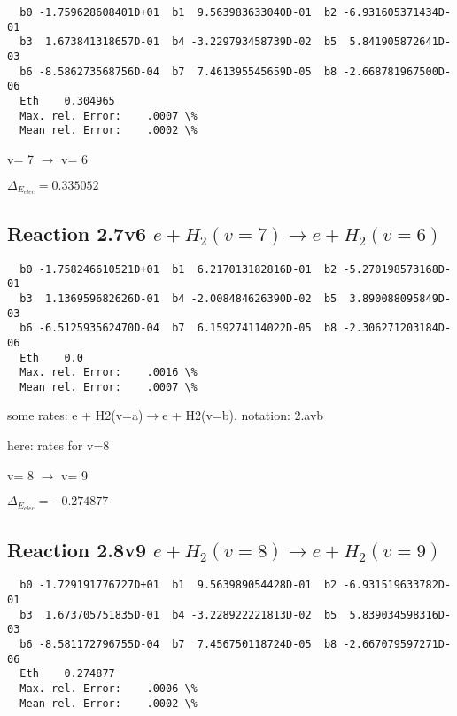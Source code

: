 \documentclass[12pt,dvipdfmx]{article}
\begin{document}
\begin{small}\begin{verbatim}
  b0 -1.759628608401D+01  b1  9.563983633040D-01  b2 -6.931605371434D-01
  b3  1.673841318657D-01  b4 -3.229793458739D-02  b5  5.841905872641D-03
  b6 -8.586273568756D-04  b7  7.461395545659D-05  b8 -2.668781967500D-06
  Eth    0.304965
  Max. rel. Error:    .0007 \%
  Mean rel. Error:    .0002 \%

\end{verbatim}\end{small}

  v=  7 $\rightarrow$ v= 6

$\Delta_{E_{elec}}= 0.335052$


\subsection{
Reaction 2.7v6
$ e + H_2(v=7) \rightarrow e + H_2(v=6) $
}


\begin{small}\begin{verbatim}
  b0 -1.758246610521D+01  b1  6.217013182816D-01  b2 -5.270198573168D-01
  b3  1.136959682626D-01  b4 -2.008484626390D-02  b5  3.890088095849D-03
  b6 -6.512593562470D-04  b7  6.159274114022D-05  b8 -2.306271203184D-06
  Eth    0.0
  Max. rel. Error:    .0016 \%
  Mean rel. Error:    .0007 \%

\end{verbatim}\end{small}
\newpage
some rates: e + H2(v=a)$\rightarrow$e + H2(v=b). notation: 2.avb

here: rates for v=8


  v=  8 $\rightarrow$ v= 9

$\Delta_{E_{elec}}=-0.274877$


\subsection{
Reaction 2.8v9
$ e + H_2(v=8) \rightarrow e + H_2(v=9) $
}

\begin{small}\begin{verbatim}
  b0 -1.729191776727D+01  b1  9.563989054428D-01  b2 -6.931519633782D-01
  b3  1.673705751835D-01  b4 -3.228922221813D-02  b5  5.839034598316D-03
  b6 -8.581172796755D-04  b7  7.456750118724D-05  b8 -2.667079597271D-06
  Eth    0.274877
  Max. rel. Error:    .0006 \%
  Mean rel. Error:    .0002 \%

\end{verbatim}\end{small}
\end{document}

